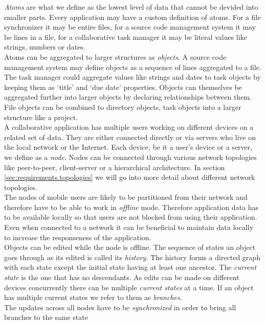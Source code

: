 \emph{Atoms} are what we define as the lowest level of data that cannot be devided into smaller parts.
Every application may have a custom definition of atoms.
For a file synchronizer it may be entire files, for a source code management system it may be lines in a file, for a collaborative task manager it may be literal values like strings, numbers or dates.\\
Atoms can be aggregated to larger structures as \emph{objects}.
A source code management system may define objects as a sequence of lines aggregated to a file.
The task manager could aggregate values like strings and dates to task objects by keeping them as `title' and `due date' properties.
Objects can themselves be aggregated further into larger objects by declaring relationships between them.
File objects can be combined to directory objects, task objects into a larger structure like a project.\\
A collaborative application has multiple users working on different devices on a related set of data.
They are either connected directly or via servers who live on the local network or the Internet.
Each device, be it a user's device or a server, we define as a \emph{node}.
Nodes can be connected through various network topologies like peer-to-peer, client-server or a hierarchical architecture.
In section \ref{sec:requirements.topologies} we will go into more detail about different network topologies.\\
The nodes of mobile users are likely to be partitioned from their network and therefore have to be able to work in \emph{offline} mode.
Therefore application data has to be available locally so that users are not blocked from using their application.
Even when connected to a network it can be beneficial to maintain data locally to increase the responseness of the application.\\
Objects can be edited while the node is offline.
The sequence of states an object goes through as its edited is called its \emph{history}.
The history forms a directed graph with each state except the initial state having at least one ancestor.
The \emph{current state} is the one that has no descendants.
As edits can be made on different devices concurrently there can be multiple \emph{current states} at a time.
If an object has multiple current states we refer to them as \emph{branches}.\\
The updates across all nodes have to be \emph{synchronized} in order to bring all branches to the same state\\
